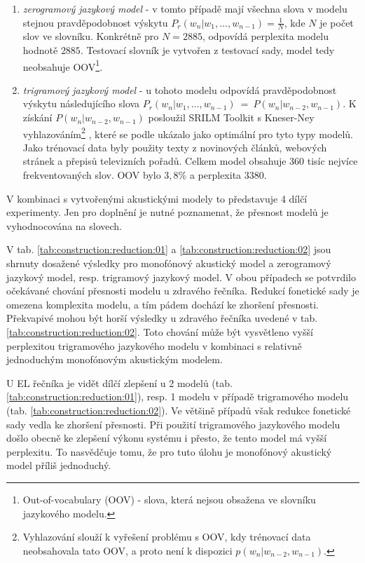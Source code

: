 \begin{enumerate}
  \item \textit{zerogramový jazykový model} - v tomto případě mají všechna slova v modelu stejnou pravděpodobnost výskytu $P_r(w_n|w_1,\dots,w_{n-1}) = \frac{1}{N}$, kde $N$ je počet slov ve slovníku. Konkrétně pro $N = 2885$, odpovídá perplexita modelu hodnotě $2885$. Testovací slovník je vytvořen z testovací sady, model tedy neobsahuje OOV\footnote{Out-of-vocabulary (OOV) - slova, která nejsou obsažena ve slovníku jazykového modelu.}.
  \item \textit{trigramový jazykový model} - u tohoto modelu odpovídá pravděpodobnost výskytu následujícího slova $P_r(w_n|w_1,\dots,w_{n-1})~=~P(w_n|w_{n-2}, w_{n-1})$. K získání $P(w_n|w_{n-2}, w_{n-1})$ posloužil SRILM Toolkit s Kneser-Ney vyhlazováním\footnote{Vyhlazování slouží k vyřešení problému s OOV, kdy trénovací data neobsahovala tato OOV, a proto není k dispozici $p(w_n|w_{n-2}, w_{n-1})$.} \cite{Stolcke2002}, které se podle \cite{Prazak2008} ukázalo jako optimální pro tyto typy modelů. Jako trénovací data byly použity texty z novinových článků, webových stránek a přepisů televizních pořadů. Celkem model obsahuje 360 tisíc nejvíce frekventovaných slov. OOV bylo $3,8 \%$ a perplexita $3380$.
\end{enumerate}

\noindent V kombinaci s vytvořenými akustickými modely to představuje 4 dílčí experimenty.
Jen pro doplnění je nutné poznamenat, že přesnost modelů je vyhodnocována na slovech.

V tab. \ref{tab:construction:reduction:01} a \ref{tab:construction:reduction:02} jsou shrnuty dosažené výsledky pro monofónový akustický model a zerogramový jazykový model, resp. trigramový jazykový model.
V obou případech se potvrdilo očekávané chování přesnosti modelu u zdravého řečníka.
Redukcí fonetické sady je omezena komplexita modelu, a tím pádem dochází ke zhoršení přesnosti.
Překvapivé mohou být horší výsledky u zdravého řečníka uvedené v tab. \ref{tab:construction:reduction:02}.
Toto chování může být vysvětleno vyšší perplexitou trigramového jazykového modelu v kombinaci s relativně jednoduchým monofónovým akustickým modelem.

U EL řečníka je vidět dílčí zlepšení u 2 modelů (tab. \ref{tab:construction:reduction:01}), resp. 1 modelu v případě trigramového modelu (tab. \ref{tab:construction:reduction:02}).
Ve většině případů však redukce fonetické sady vedla ke zhoršení přesnosti.
Při použití trigramového jazykového modelu došlo obecně ke zlepšení výkonu systému i přesto, že tento model má vyšší perplexitu.
To nasvědčuje tomu, že pro tuto úlohu je monofónový akustický model příliš jednoduchý.

